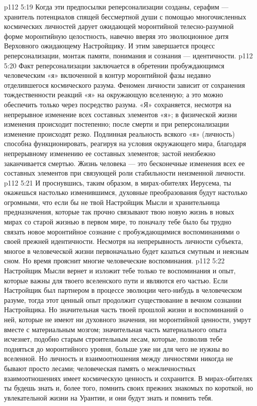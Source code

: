 \vs p112 5:19 \pc {}\bibnobreakspace Когда эти предпосылки реперсонализации созданы, серафим --- хранитель потенциалов спящей бессмертной души с помощью многочисленных космических личностей дарует ожидающей моронтийной телесно\hyp{}разумной форме моронтийную целостность, навечно вверяя это эволюционное дитя Верховного ожидающему Настройщику. И этим завершается процесс реперсонализации, монтаж памяти, понимания и сознания --- идентичности.
\vs p112 5:20 \pc Факт реперсонализации заключается в обретении пробуждающимся человеческим «я» включенной в контур моронтийной фазы недавно отделившегося космического разума. Феномен личности зависит от сохранения тождественности реакций «я» на окружающую вселенную; а это можно обеспечить только через посредство разума. «Я» сохраняется, несмотря на непрерывное изменение всех составных элементов «я»; в физической жизни изменения происходит постепенно; после смерти и при реперсонализации изменение происходят резко. Подлинная реальность всякого «я» (личность) способна функционировать, реагируя на условия окружающего мира, благодаря непрерывному изменению ее составных элементов; застой неизбежно заканчивается смертью. Жизнь человека --- это бесконечные изменения всех ее составных элементов при связующей роли стабильности неизменной личности.
\vs p112 5:21 И проснувшись, таким образом, в мирах\hyp{}обителях Иерусема, ты окажешься настолько изменившимся, духовные преобразования будут настолько огромными, что если бы не твой Настройщик Мысли и хранительница предназначения, которые так прочно связывают твою новую жизнь в новых мирах со старой жизнью в первом мире, то поначалу тебе было бы трудно связать новое моронтийное сознание с пробуждающимися воспоминаниями о своей прежней идентичности. Несмотря на непрерывность личности субъекта, многое в человеческой жизни первоначально будет казаться смутным и неясным сном. Но время прояснит многие человеческие воспоминания.
\vs p112 5:22 Настройщик Мысли вернет и изложит тебе только те воспоминания и опыт, которые важны для твоего вселенского пути и являются его частью. Если Настройщик был партнером в процессе эволюции чего\hyp{}нибудь в человеческом разуме, тогда этот ценный опыт продолжит существование в вечном сознании Настройщика. Но значительная часть твоей прошлой жизни и воспоминаний о ней, которые не имеют ни духовного значения, ни моронтийной ценности, умрут вместе с материальным мозгом; значительная часть материального опыта исчезнет, подобно старым строительным лесам, которые, позволив тебе подняться до моронтийного уровня, больше уже ни для чего не нужны во вселенной. Но личность и взаимоотношения между личностями никогда не бывают просто лесами; человеческая память о межличностных взаимоотношениях имеет космическую ценность и сохранится. В мирах\hyp{}обителях ты будешь знать и, более того, помнить своих прежних знакомых по короткой, но увлекательной жизни на Урантии, и они будут знать и помнить тебя.
